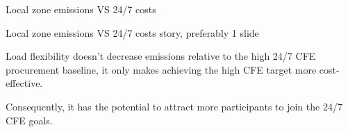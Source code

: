 \begin{frame}{Local zone emissions VS 24/7 costs}

  {\footnotesize
  \vspace{0.2cm}

  Local zone emissions VS 24/7 costs story, preferably 1 slide

  Load flexibility doesn't decrease emissions relative to the high 24/7 CFE procurement baseline, it only makes achieving the high CFE target more cost-effective.

  Consequently, it has the potential to attract more participants to join the
  24/7 CFE goals.

  }
\end{frame}






    


